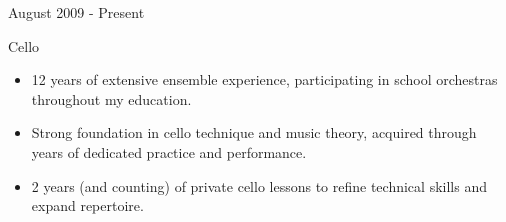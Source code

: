 \documentclass[a4paper]{article}
\newlength{\cvcolumngapwidth}
\newlength{\cvleftcolumnwidth}
\newlength{\cvrightcolumnwidth}
\newcommand{\cvtitlestyle}[1]{{\large\cvtitlefont\textcolor{cvtitlecolor}{#1}}}
\newcommand{\cvdurationstyle}[1]{{\small\cvdurationfont\textcolor{cvdurationcolor}{#1}}}
\newlength{\cvafteritemskipamount}
\newlength{\cvaftertitleskipamount}
\newlength{\cvparskip}
\newcommand{\cvitem}[2]{
    \begin{minipage}[t]{\cvleftcolumnwidth}
        \raggedleft #1
    \end{minipage}%
    \hspace{\cvcolumngapwidth}%
    \begin{minipage}[t]{\cvrightcolumnwidth}
        \setlength{\parskip}{\cvparskip} #2
    \end{minipage}

    \vspace{\cvafteritemskipamount}
}
\newcommand{\cvtitle}[1]{
    \cvtitlestyle{#1}

    \vspace{\cvaftertitleskipamount}
    \vspace{-\cvparskip}
}
\begin{document}
\vspace{6mm}

\cvitem{
    \cvdurationstyle{August 2009 - Present}
}{
  \cvtitle{Cello}

    \begin{itemize}[leftmargin=*]
        \item 12 years of extensive ensemble experience, participating in school orchestras throughout my education.
        \item Strong foundation in cello technique and music theory, acquired through years of dedicated practice and performance.
        \item 2 years (and counting) of private cello lessons to refine technical skills and expand repertoire.
    \end{itemize}
}
\end{document}
